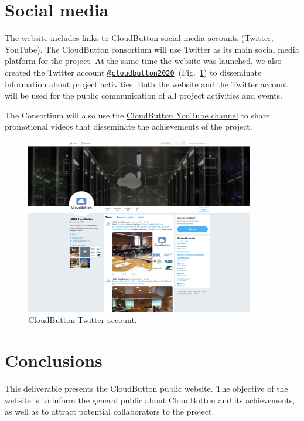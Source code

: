\documentclass[a4paper,11pt]{article}
\numberwithin{table}{subsection} %
\begin{document}
\section{Social media}

The website includes links to CloudButton social media accounts (Twitter, YouTube). The CloudButton consortium will use Twitter as its main social media platform for the project.  At the same time the website was launched, we also created the Twitter account \href{https://twitter.com/cloudbutton2020}{\texttt{@cloudbutton2020}}~(Fig.~\ref{fig:twitter}) to disseminate information about project activities. Both the website and the Twitter account will be used for the public communication of all project activities and events.

The Consortium will also use the \href{https://www.youtube.com/channel/UCJTICoSQJXlfgkoYP3-ltUA}{CloudButton YouTube channel} to share promotional videos that disseminate the achievements of the project.

\begin{figure}[hbt!]
\centering
\includegraphics[width=10cm]{figures/twitter_account.png}
\caption{CloudButton Twitter account.}
\label{fig:twitter}
\end{figure}


\newpage

\section{Conclusions}
\label{sec:conclusions}

This deliverable presents the CloudButton public website.
The objective of the website is to inform the general public about CloudButton and its achievements, as well as to attract potential collaborators to the project.
\end{document}
